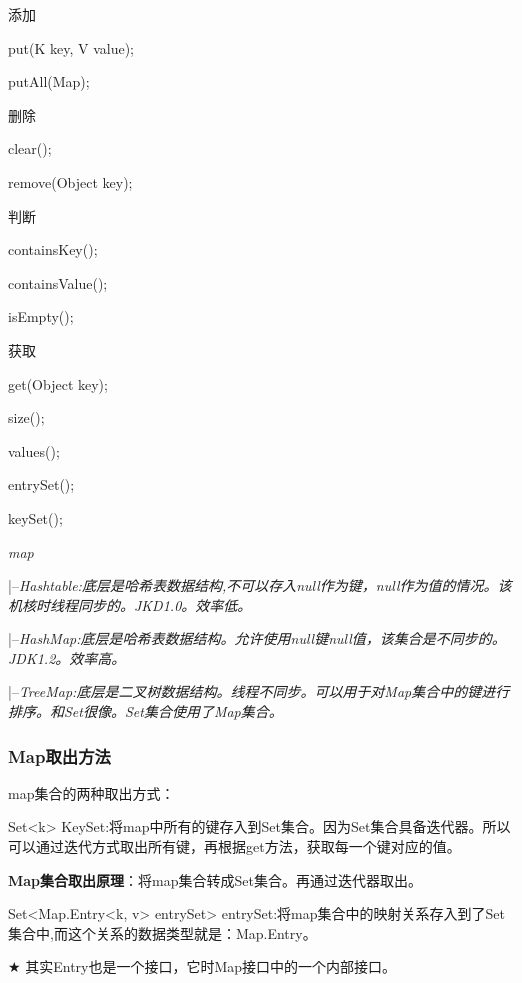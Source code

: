 \documentclass[UTF8]{ctexart}
\begin{document}
\textbullet 添加

\qquad put(K key, V value);

\qquad putAll(Map);

\textbullet 删除

\qquad clear();

\qquad remove(Object key);

\textbullet 判断

\qquad containsKey();

\qquad containsValue();

\qquad isEmpty();

\textbullet 获取

\qquad get(Object key);

\qquad size();

\qquad values();

\qquad entrySet();

\qquad keySet();


\em{map}

\qquad |--\em{Hashtable}:底层是哈希表数据结构,不可以存入null作为键，null作为值的情况。该机核时线程同步的。JKD1.0。效率低。

\qquad |--\em{HashMap}:底层是哈希表数据结构。允许使用null键null值，该集合是不同步的。JDK1.2。效率高。

\qquad |--\em{TreeMap}:底层是二叉树数据结构。线程不同步。可以用于对Map集合中的键进行排序。和Set很像。Set集合使用了Map集合。


\subsubsection{Map取出方法}

map集合的两种取出方式：

\textbullet Set<k> KeySet:将map中所有的键存入到Set集合。因为Set集合具备迭代器。所以可以通过迭代方式取出所有键，再根据get方法，获取每一个键对应的值。

\textbf{Map集合取出原理}：将map集合转成Set集合。再通过迭代器取出。

\textbullet Set<Map.Entry<k, v> entrySet> entrySet:将map集合中的映射关系存入到了Set集合中,而这个关系的数据类型就是：Map.Entry。


$\bigstar$ 其实Entry也是一个接口，它时Map接口中的一个内部接口。


\end{document}
